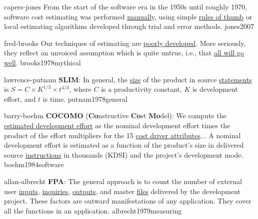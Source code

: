 \documentclass{article}
\begin{document}

\lnQuote
  {capers-jones}
  {From the start of the software era in the 1950s until roughly 1970, software cost estimating was performed \ul{manually}, using simple \ul{rules of thumb} or local estimating algorithms developed through trial and error methods.}
  {jones2007}

\lnQuote
  {fred-brooks}
  {Our techniques of estimating are \ul{poorly developed}. More seriously, they reflect an unvoiced assumption which is quite untrue, i.e., that \ul{all will go well}.}
  {brooks1978mythical}

\lnQuote
  {lawrence-putnam}
  {\textbf{SLIM}: In general, the \ul{size} of the product in source \ul{statements} is \(S = C \times K^{1/3} \times t^{4/3}\), where \(C\) is a productivity constant, \(K\) is development effort, and \(t\) is time.}
  {putnam1978general}

\lnQuote
  {barry-boehm}
  {\textbf{COCOMO} (\textbf{Co}nstructive \textbf{Co}st \textbf{Mo}del): We compute the \ul{estimated development effort} as the nominal development effort times the product of the effort multipliers for the 15 \ul{cost driver attributes}... A nominal development effort is estimated as a function of the product's size in delivered source \ul{instructions} in thousands (KDSI) and the project's development mode.}
  {boehm1984software}

\lnQuote
  {allan-albrecht}
  {\textbf{FPA}: The general approach is to count the number of external user \ul{inputs}, \ul{inquiries}, \ul{outputs}, and master \ul{files} delivered by the development project. These factors are outward manifestations of any application. They cover all the functions in an application.}
  {albrecht1979measuring}

\end{document}
